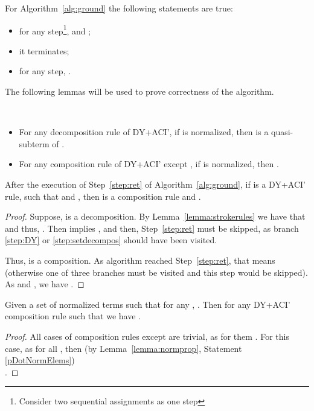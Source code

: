 \begin{lemma}\label{lemma:propalgo}
	For Algorithm~\ref{alg:ground} the following statements are true:
	\begin{itemize}
		\item for any step\footnote{Consider two sequential assignments as one step},  and ;
		\item it terminates;
		\item for any step, .
	\end{itemize}

\end{lemma}

The following lemmas will be used to prove correctness of the algorithm. 

\begin{lemma}\label{lemma:strokerules} \
\begin{itemize}
	\item For any decomposition rule  of DY+ACI', if   is normalized, then  is a quasi-subterm of .
	\item For any composition rule  of DY+ACI' except , if  is normalized, then .
\end{itemize}
\end{lemma}




\begin{lemma}\label{lemma:walkout}
	After the execution of Step~\ref{step:ret} of Algorithm~\ref{alg:ground}, if  is a DY+ACI' rule, such that  and , then  is a composition rule and .
\begin{proof}
	Suppose,  is a decomposition.   By Lemma~\ref{lemma:strokerules} we have that  and thus, . Then   implies , and then, Step~\ref{step:ret} must be skipped, as branch \ref{step:DY} or \ref{step:setdecompos} should have been visited. 

	Thus,  is  a composition.
	 As algorithm reached  Step~\ref{step:ret}, that means  (otherwise one of three branches must be visited and this step would be skipped). As  and , we have .
\end{proof}

\end{lemma}

\begin{lemma}\label{lemma:composelems}
	Given a set of normalized terms  such that for any , .
	Then for any DY+ACI' composition rule  such that  we have .
\begin{proof}
	All cases of composition rules except  are trivial, as for them .
	For this case, as  for all , then (by Lemma~\ref{lemma:normprop}, Statement \ref{pDotNormElems})  \\ .
\end{proof}

\end{lemma}


